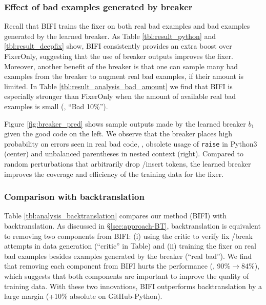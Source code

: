 \subsubsection{Effect of bad examples generated by breaker}
\label{sec:analysis-breaker}

Recall that BIFI trains the fixer on both real bad examples and bad examples generated by the learned breaker. As Table \ref{tbl:result_python} and \ref{tbl:result_deepfix} show, BIFI consistently provides an extra boost over FixerOnly, suggesting that the use of breaker outputs improves the fixer. Moreover, another benefit of the breaker is that one can sample many bad examples from the breaker to augment real bad examples, if their amount is limited.
In Table \ref{tbl:result_analysis_bad_amount} we find that BIFI is especially stronger than FixerOnly when the amount of available real bad examples is small (\eg, ``Bad 10\%'').

Figure \ref{fig:breaker_pred} shows sample outputs made by the learned breaker $b_1$ given the good code on the left. We observe that the breaker places high probability on errors seen in real bad code, \ie, obsolete usage of \texttt{raise} in Python3 (center) and unbalanced parentheses in nested context (right). Compared to random perturbations that arbitrarily drop \slash insert tokens, the learned breaker improves the coverage and efficiency of the training data for the fixer.




\subsubsection{Comparison with backtranslation} 
\label{sec:analysis-BT}

Table \ref{tbl:analysis_backtranslation} compares our method (BIFI) with backtranslation.
As discussed in \S \ref{sec:approach-BT}, backtranslation is equivalent to removing two components from BIFI: (i) using the critic to verify fix \slash break attempts in data generation (``critic'' in Table) and (ii) training the fixer on real bad examples besides examples generated by the breaker (``real bad''). We find that removing each component from BIFI hurts the performance (\eg, 90\%$\rightarrow$84\%), which suggests that both components are important to improve the quality of training data. With these two innovations, BIFI outperforms backtranslation by a large margin (+10\% absolute on GitHub-Python). 




